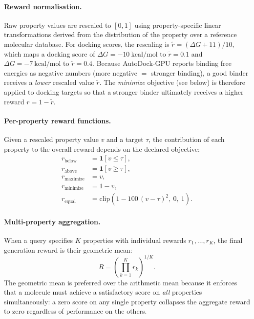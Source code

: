 \paragraph{Reward normalisation.}
Raw property values are rescaled to $[0, 1]$ using property-specific linear
transformations derived from the distribution of the property over a
reference molecular database.  For docking scores, the rescaling is
$\tilde{r} = (\Delta G + 11) / 10$, which maps a docking score of
$\Delta G = -10~\text{kcal/mol}$ to $\tilde{r}=0.1$ and
$\Delta G = -7~\text{kcal/mol}$ to $\tilde{r}=0.4$.  Because AutoDock-GPU
reports binding free energies as negative numbers (more negative $= $ stronger
binding), a good binder receives a \emph{lower} rescaled value $\tilde{r}$.
The \textit{minimize} objective (see below) is therefore applied to docking
targets so that a stronger binder ultimately receives a higher reward
$r = 1 - \tilde{r}$.

\paragraph{Per-property reward functions.}
Given a rescaled property value $v$ and a target $\tau$, the contribution of
each property to the overall reward depends on the declared objective:
\begin{align}
  r_{\text{below}}  &= \mathbf{1}[v \leq \tau],    \\
  r_{\text{above}}  &= \mathbf{1}[v \geq \tau],    \\
  r_{\text{maximize}} &= v,                         \\
  r_{\text{minimize}} &= 1 - v,                     \\
  r_{\text{equal}} &= \mathrm{clip}\!\left(1 - 100\,(v-\tau)^2,\ 0,\ 1\right).
\end{align}

\paragraph{Multi-property aggregation.}
When a query specifies $K$ properties with individual rewards
$r_1,\ldots,r_K$, the final generation reward is their geometric mean:
\begin{equation}
  \label{eq:geo_mean}
  R = \left(\prod_{k=1}^{K} r_k\right)^{1/K}.
\end{equation}
The geometric mean is preferred over the arithmetic mean because it enforces
that a molecule must achieve a satisfactory score on \emph{all} properties
simultaneously: a zero score on any single property collapses the aggregate
reward to zero regardless of performance on the others.

